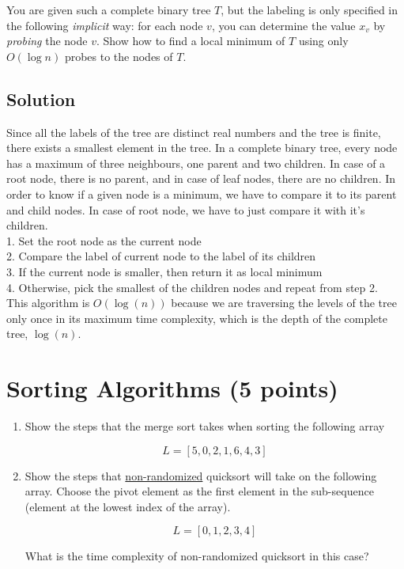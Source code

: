 \documentclass[letter,11pt]{article}
\begin{document}
You are given such a complete binary tree $T$, but the labeling is only specified in the following \emph{implicit} way: for each node $v$, you can determine the value $x_v$ by \emph{probing} the node $v$. Show how to find a local minimum of $T$ using only $O(\log n)$ probes to the nodes of $T$.

\subsection{Solution}

Since all the labels of the tree are distinct real numbers and the tree is finite, there exists a smallest element in the tree. In a complete binary tree, every node has a maximum of three neighbours, one parent and two children. In case of a root node, there is no parent, and in case of leaf nodes, there are no children. In order to know if a given node is a minimum, we have to compare it to its parent and child nodes. In case of root node, we have to just compare it with it's children.\\
1. Set the root node as the current node\\
2. Compare the label of current node to the label of its children\\
3. If the current node is smaller, then return it as local minimum\\
4. Otherwise, pick the smallest of the children nodes and repeat from step 2.\\

This algorithm is $O(\log(n))$ because we are traversing the levels of the tree only once in its maximum time complexity, which is the depth of the complete tree, $\log(n)$.


\section{Sorting Algorithms (5 points)}

\begin{enumerate}
\item Show the steps that the merge sort takes when sorting the following array

  \[ L = [5, 0, 2, 1, 6, 4, 3] \]
  
\item Show the steps that \underline{non-randomized} quicksort will take on the following array.  Choose the pivot element as the first element in the sub-sequence (element at the lowest index of the array).

  \[ L = [0, 1, 2, 3, 4] \]
  
  What is the time complexity of non-randomized quicksort in this case?
\end{enumerate}
\end{document}
